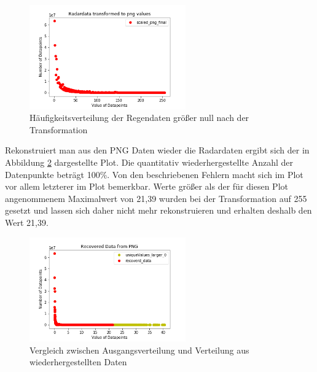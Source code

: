 \begin{figure}[H]
    \centering
    \includegraphics[width=0.6\textwidth,angle=0]{abb/Radardatapoints_of_June_2016_TransformedToPNG.png}
    \caption[Datenaufbereitung]{Häufigkeitsverteilung der Regendaten größer null nach der Transformation}
    \label{fig:Radardatapoints_of_June_2016_Radardatapoints_of_June_2016_TransformedToPNG}
\end{figure}

Rekonstruiert man aus den PNG Daten wieder die Radardaten ergibt sich der in Abbildung \ref{fig:Radardatapoints_of_June_2016_Radardatapoints_of_June_2016_RecoveredData} dargestellte Plot. Die quantitativ wiederhergestellte Anzahl der Datenpunkte beträgt 100\%. 
Von den beschriebenen Fehlern macht sich im Plot vor allem letzterer im Plot bemerkbar.
Werte größer als der für diesen Plot angenommenem Maximalwert von 21,39 wurden bei der Transformation auf 255 gesetzt und lassen sich daher nicht mehr rekonstruieren und erhalten deshalb den Wert 21,39.

\begin{figure}[H]
    \centering
    \includegraphics[width=0.6\textwidth,angle=0]{abb/Radardatapoints_of_June_2016_RecoveredData.png}
    \caption[Datenaufbereitung]{Vergleich zwischen Ausgangsverteilung und Verteilung aus wiederhergestellten Daten}
    \label{fig:Radardatapoints_of_June_2016_Radardatapoints_of_June_2016_RecoveredData}
\end{figure}
